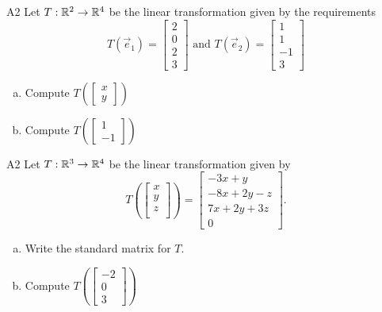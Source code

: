 \begin{problem}{A2}
Let $T: \mathbb{R}^2\rightarrow \mathbb{R}^4$ be the linear transformation given by the requirements
\[ T(\vec e_1)=\begin{bmatrix}
2   \\ 0   \\ 2  \\ 3
\end{bmatrix} \text{ and }
T(\vec e_2)=\begin{bmatrix}
1   \\  1  \\ -1  \\ 3
\end{bmatrix} \]
\begin{enumerate}[(a)]
\item Compute \( T\left( \begin{bmatrix}x\\ y  \end{bmatrix} \right) \)
\item Compute \(T\left( \begin{bmatrix}  1 \\ -1 \end{bmatrix}\right)\)
\end{enumerate}
\end{problem}

\begin{problem}{A2}
Let $T: \mathbb{R}^3\rightarrow \mathbb{R}^4$ be the linear transformation given by $$T\left(\begin{bmatrix} x \\ y \\ z \\  \end{bmatrix} \right) = \begin{bmatrix} -3x+y \\ -8x+2y-z \\ 7x+2y+3z \\ 0 \end{bmatrix}.$$
\begin{enumerate}[(a)]
\item Write the standard matrix for $T$.
\item Compute \( T\left( \begin{bmatrix}-2 \\ 0 \\ 3 \end{bmatrix} \right) \)
\end{enumerate}
\end{problem}

